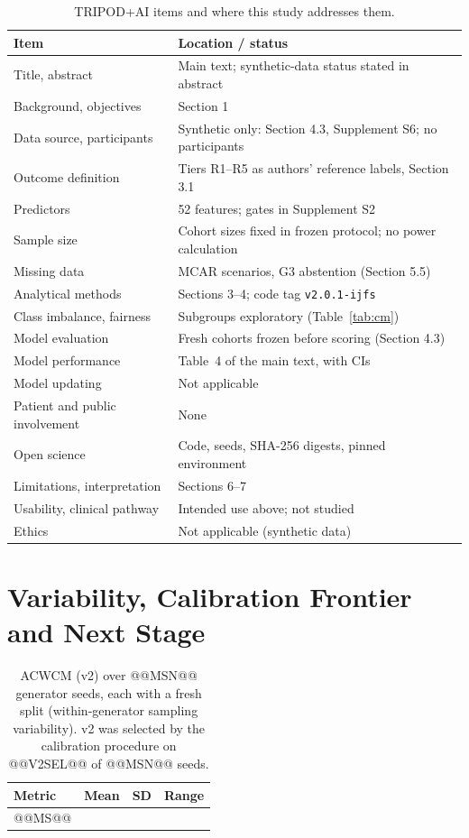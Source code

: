 \documentclass[11pt,a4paper]{article}%
\theoremstyle{plain}%
\theoremstyle{remark}%
\begin{document}
\begin{table}[h]
\caption{TRIPOD+AI items and where this study addresses them.}\label{tab:tripod}
\footnotesize
\begin{tabular}{@{}p{}p{}@{}}
\toprule
Item & Location / status \\
\midrule
Title, abstract & Main text; synthetic-data status stated in abstract \\
Background, objectives & Section 1 \\
Data source, participants & Synthetic only: Section 4.3, Supplement S6; no participants \\
Outcome definition & Tiers R1--R5 as authors' reference labels, Section 3.1 \\
Predictors & 52 features; gates in Supplement S2 \\
Sample size & Cohort sizes fixed in frozen protocol; no power calculation \\
Missing data & MCAR scenarios, G3 abstention (Section 5.5) \\
Analytical methods & Sections 3--4; code tag \texttt{v2.0.1-ijfs} \\
Class imbalance, fairness & Subgroups exploratory (Table~\ref{tab:cm}) \\
Model evaluation & Fresh cohorts frozen before scoring (Section 4.3) \\
Model performance & Table~4 of the main text, with CIs \\
Model updating & Not applicable \\
Patient and public involvement & None \\
Open science & Code, seeds, SHA-256 digests, pinned environment \\
Limitations, interpretation & Sections 6--7 \\
Usability, clinical pathway & Intended use above; not studied \\
Ethics & Not applicable (synthetic data) \\
\bottomrule
\end{tabular}
\end{table}

\section{Variability, Calibration Frontier and Next Stage}\label{sup:next}

\begin{table}[h]
\caption{ACWCM (v2) over @@MSN@@ generator seeds, each with a fresh split (within-generator sampling variability). v2 was selected by the calibration procedure on @@V2SEL@@ of @@MSN@@ seeds.}\label{tab:ms}
\small
\begin{tabular}{@{}lrrr@{}}
\toprule
Metric & Mean & SD & Range \\
\midrule
@@MS@@
\bottomrule
\end{tabular}
\end{table}
\end{document}
